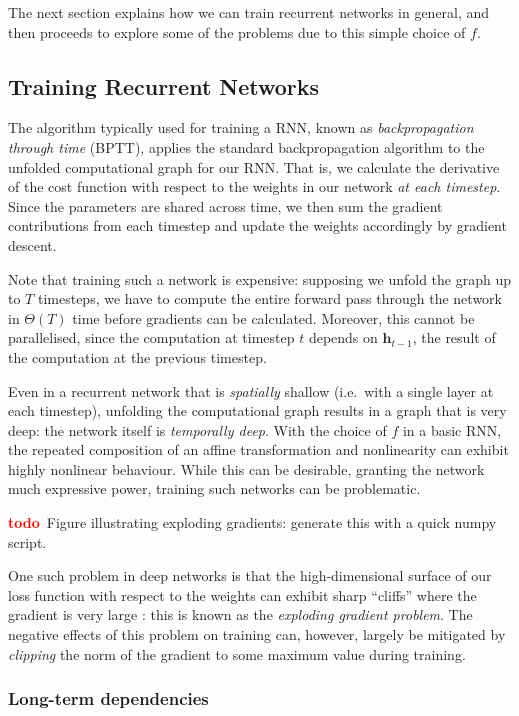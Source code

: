 \documentclass[12pt,a4paper,twoside,openright]{report}
\newcommand{\vect}[1]{\boldsymbol{\mathbf{#1}}}
\newcommand{\todo}{\textcolor{red}{\textbf{todo}~}}
\begin{document}
The next section explains how we can train recurrent networks in general, and
then proceeds to explore some of the problems due to this simple choice of $f$.

\subsection{Training Recurrent Networks}

The algorithm typically used for training a RNN, known as \emph{backpropagation
through time} (BPTT), applies the standard backpropagation algorithm to the
unfolded computational graph for our RNN. That is, we calculate the derivative
of the cost function with respect to the weights in our network \emph{at each
timestep}. Since the parameters are shared across time, we then sum the gradient
contributions from each timestep and update the weights accordingly by gradient
descent.

Note that training such a network is expensive: supposing we unfold the graph up
to $T$ timesteps, we have to compute the entire forward pass through the network
in $\Theta(T)$ time before gradients can be calculated. Moreover, this cannot be
parallelised, since the computation at timestep $t$ depends on
$\vect{h}_{t-1}$, the result of the computation at the previous timestep.

Even in a recurrent network that is \emph{spatially} shallow (i.e.\ with a
single layer at each timestep), unfolding the computational graph results in a
graph that is very deep: the network itself is \emph{temporally deep}. With the
choice of $f$ in a basic RNN, the repeated composition of an affine
transformation and nonlinearity can exhibit highly nonlinear behaviour. While
this can be desirable, granting the network much expressive power, training such
networks can be problematic. 

\todo Figure illustrating exploding gradients: generate this with a quick numpy
script.

One such problem in deep networks is that the high-dimensional surface of our
loss function with respect to the weights can exhibit sharp ``cliffs'' where the
gradient is very large \cite{Goodfellow-et-al-2016}: this is known as the
\emph{exploding gradient problem}. The negative effects of this problem on
training can, however, largely be mitigated by \emph{clipping} the norm of the
gradient to some maximum value during training.

\subsubsection{Long-term dependencies}
\end{document}
